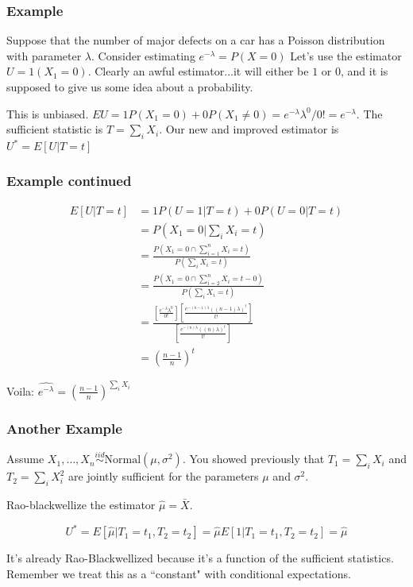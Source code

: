 \documentclass{beamer}
\begin{document}
\begin{frame}
\frametitle{Example}

Suppose that the number of major defects on a car has a Poisson distribution with parameter $\lambda$. Consider estimating $e^{-\lambda} = P(X=0)$ Let's use the estimator $U = 1(X_1 = 0)$. Clearly an awful estimator...it will either be $1$ or $0$, and it is supposed to give us some idea about a probability.
\newline

This is unbiased. $EU = 1P(X_1 = 0) + 0 P(X_1 \neq 0) = e^{-\lambda} \lambda^0 / 0! = e^{-\lambda}$. The sufficient statistic is $T = \sum_i X_i$. Our new and improved estimator is $U^* = E[U | T=t]$

\end{frame}
\begin{frame}
\frametitle{Example continued}

\begin{align*}
E[U | T=t] &= 1 P(U = 1 | T=t) + 0 P(U = 0|T=t) \\
&= P(X_1 = 0 \bigg\rvert  \sum_i X_i = t) \\
&= \frac{P\left(X_1 = 0 \cap \sum_{i=1}^n X_i = t \right)}{P(\sum_i X_i = t)}  \\
&= \frac{P(X_1 = 0 \cap \sum_{i=2}^n X_i = t-0)}{P(\sum_i X_i = t) } \\
&= \frac{ \left[\frac{e^{-\lambda}\lambda^0}{0!} \right] \left[ \frac{e^{-(n-1)\lambda} ((n-1)\lambda)^t}{t!} \right] }{ \left[\frac{e^{-(n)\lambda} ((n)\lambda)^t}{t!} \right]} \\
&= \left(\frac{n-1}{n}\right)^t
\end{align*}

Voila: $\widehat{e^{-\lambda}} = \left(\frac{n-1}{n}\right)^{\sum_i X_i}$ 

\end{frame}

\begin{frame}
\frametitle{Another Example}

Assume $X_1, \ldots, X_n \overset{iid}{\sim} \text{Normal}(\mu, \sigma^2)$. You showed previously that $T_1 = \sum_i X_i$ and $T_2 = \sum_i X_i^2$ are jointly sufficient for the parameters $\mu$ and $\sigma^2$.
\newline

Rao-blackwellize the estimator $\hat{\mu} = \bar{X}$.
\newline
\pause

\[
U^* = E[\hat{\mu}|T_1 = t_1, T_2 = t_2] = \hat{\mu} E[1|T_1 = t_1, T_2 = t_2] =\hat{\mu} 
\]
\pause

It's already Rao-Blackwellized because it's a function of the sufficient statistics. Remember we treat this as a ``constant" with conditional expectations.
\end{frame}
\end{document}

